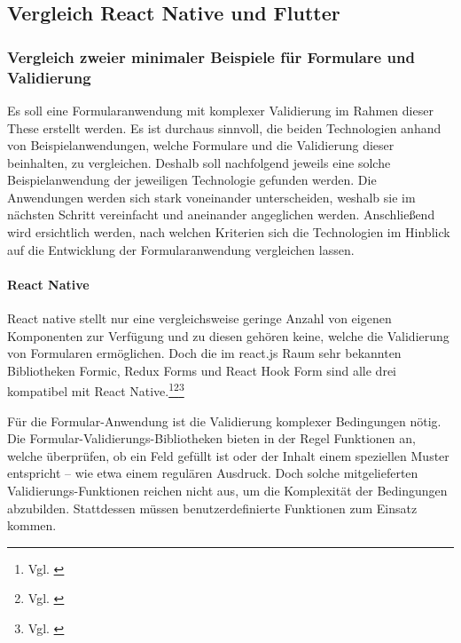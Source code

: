 
\subsection{Vergleich React Native und Flutter}

\subsubsection{Vergleich zweier minimaler Beispiele für Formulare und Validierung}


Es soll eine Formularanwendung mit komplexer Validierung im Rahmen dieser These erstellt werden.
Es ist durchaus sinnvoll, die beiden Technologien anhand von  Beispielanwendungen, welche Formulare und die Validierung dieser  beinhalten,   zu vergleichen.  Deshalb soll nachfolgend  jeweils eine solche Beispielanwendung der jeweiligen Technologie gefunden werden. Die Anwendungen werden sich stark voneinander unterscheiden, weshalb sie im nächsten Schritt vereinfacht und aneinander angeglichen werden.  Anschließend wird ersichtlich werden, nach welchen Kriterien sich die Technologien im Hinblick auf die Entwicklung der Formularanwendung vergleichen lassen.

\paragraph{React Native}

React native stellt nur eine vergleichsweise geringe Anzahl von eigenen Komponenten zur Verfügung und zu diesen gehören keine, welche die Validierung von Formularen ermöglichen.
Doch die im react.js Raum sehr bekannten Bibliotheken Formic, Redux Forms und React Hook Form sind alle drei kompatibel mit React Native.\footnote{Vgl. \cite{ReactNativeFormikDocs}}\footnote{Vgl. \cite{DoesReduxFormWorkWithReactNative}}\footnote{Vgl. \cite{ReactNativeReactHookFormGetStarted}}




Für die Formular-Anwendung ist die Validierung komplexer Bedingungen nötig.
Die Formular-Validierungs-Bibliotheken bieten in der Regel Funktionen an, welche überprüfen, ob ein Feld gefüllt ist oder der Inhalt einem speziellen Muster entspricht – wie etwa einem regulären Ausdruck.
Doch solche mitgelieferten Validierungs-Funktionen reichen nicht aus, um die Komplexität der Bedingungen abzubilden.
Stattdessen müssen benutzerdefinierte Funktionen zum Einsatz kommen.

